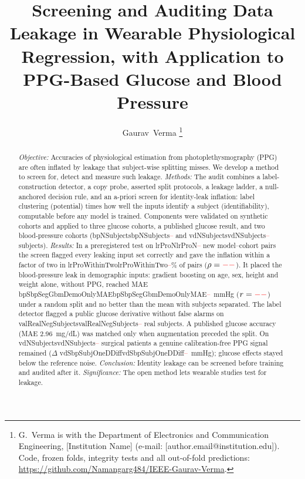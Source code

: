 \documentclass[journal]{IEEEtran}
\newcommand{\m}[1]{\ifcsname #1\endcsname\csname #1\endcsname\else\textcolor{red}{--}\fi}
\begin{document}
\title{Screening and Auditing Data Leakage in Wearable Physiological
       Regression, with Application to PPG-Based Glucose and Blood Pressure}

\author{Gaurav~Verma%
\thanks{G.~Verma is with the Department of Electronics and Communication
Engineering, [Institution Name] (e-mail: [author.email@institution.edu]).
Code, frozen folds, integrity tests and all out-of-fold predictions:
\url{https://github.com/Namangarg484/IEEE-Gaurav-Verma}.}}


\maketitle

\begin{abstract}
\textit{Objective:} Accuracies of physiological estimation from
photoplethysmography (PPG) are often inflated by leakage that
subject-wise splitting misses.  We develop a method to screen for,
detect and measure such leakage.
\textit{Methods:} The audit combines a label-construction detector, a copy
probe, asserted split protocols, a leakage ladder, a null-anchored decision
rule, and an a-priori screen for identity-leak inflation: label clustering
(potential) times how well the inputs identify a subject (identifiability),
computable before any model is trained.  Components were validated on
synthetic cohorts and applied to three glucose cohorts, a published glucose
result, and two blood-pressure cohorts (\m{bpNSubjects} and \m{vdNSubjects} subjects).
\textit{Results:} In a preregistered test on \m{lrProN} new model--cohort pairs
the screen flagged every leaking input set correctly and gave the inflation
within a factor of two in \m{lrProWithinTwo}\% of pairs ($\rho=\m{lrProRho}$).  It
placed the blood-pressure leak in demographic inputs: gradient boosting on
age, sex, height and weight alone, without PPG, reached MAE
\m{bpSbpSegGbmDemoOnlyMAE}~mmHg ($r=\m{bpSbpSegGbmDemoOnlyR}$) under a random split
and no better than the mean with subjects separated.  The label detector flagged a public glucose derivative without false alarms
on \m{valRealNegSubjects} real subjects.
A published glucose accuracy (MAE 2.96~mg/dL) was matched only when
augmentation preceded the split.  On \m{vdNSubjects} surgical patients a
genuine calibration-free PPG signal remained ($\Delta$
\m{vdSbpSubjOneDDiff}~mmHg); glucose effects stayed below the reference noise.
\textit{Conclusion:} Identity leakage can be screened before training and
audited after it.
\textit{Significance:} The open method lets wearable studies test for
leakage.
\end{abstract}
\end{document}
